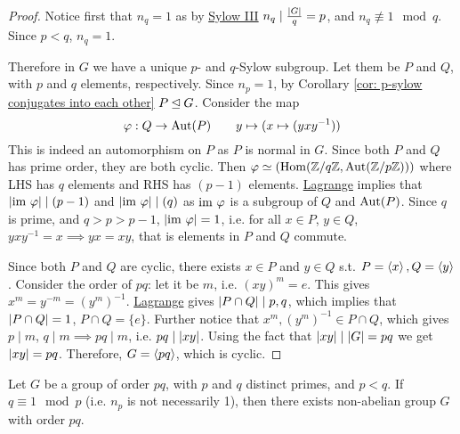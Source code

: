\documentclass{article}
\begin{document}
\begin{proof}
    Notice first that $n_q = 1$ as by \hyperref[thm: Sylow III]{Sylow III} $n_q \mid \frac{\left|G\right|}{q} = p$, and $n_q \nequiv 1 \mod{q}$. Since $p < q$, $n_q = 1$.
    
    Therefore in $G$ we have a unique $p$- and $q$-Sylow subgroup. Let them be $P$ and $Q$, with $p$ and $q$ elements, respectively. Since $n_p = 1$, by Corollary \ref{cor: p-sylow conjugates into each other} $P \unlhd G$. Consider the map
    \[
        \varphi: Q \to \mathrm{Aut}(P) \qquad y \mapsto (x \mapsto (y x y^{-1}))
    \]
    This is indeed an automorphism on $P$ as $P$ is normal in $G$. Since both $P$ and $Q$ has prime order, they are both cyclic. Then $\varphi \simeq (\mathrm{Hom}(\mathbb{Z}/q\mathbb{Z}, \mathrm{Aut}(\mathbb{Z}/p\mathbb{Z})))$ where LHS has $q$ elements and RHS has $(p-1)$ elements. \hyperref[thm: Lagrange]{Lagrange} implies that $\left|\mathrm{im}\  \varphi\right| \mid (p-1)$ and $\left|\mathrm{im}\  \varphi\right| \mid (q)$ as $\mathrm{im}\  \varphi$ is a subgroup of $Q$ and $\mathrm{Aut}(P)$. Since $q$ is prime, and $q > p > p-1$, $\left|\mathrm{im}\  \varphi\right| = 1$, i.e. for all $x \in P$, $y \in Q$, $yxy^{-1} = x \implies yx = xy$, that is elements in $P$ and $Q$ commute. 

    Since both $P$ and $Q$ are cyclic, there exists $x \in P$ and $y \in Q$ s.t. $P = \left\langle x \right\rangle, Q = \left\langle y \right\rangle$. Consider the order of $pq$: let it be $m$, i.e. $(xy)^m = e$. This gives $x^m = y^{-m} = (y^m)^{-1}$. \hyperref[thm: Lagrange]{Lagrange} gives $\left|P \cap Q\right| \mid p, q$, which implies that $\left|P \cap Q\right| = 1$, $P \cap Q = \{e\}$. Further notice that $x^m, (y^m)^{-1} \in P \cap Q$, which gives $p \mid m$, $q \mid m \implies pq \mid m$, i.e. $pq \mid \left|xy\right|$. Using the fact that $\left|xy\right| \mid \left|G\right| = pq$ we get $\left|xy\right| = pq$. Therefore, $G = \left\langle pq \right\rangle$, which is cyclic.
\end{proof}

\begin{proposition}
    Let $G$ be a group of order $pq$, with $p$ and $q$ distinct primes, and $p < q$. If $q \equiv 1 \mod{p}$ (i.e. $n_p$ is not necessarily 1), then there exists non-abelian group $G$ with order $pq$. 
\end{proposition}
\end{document}
